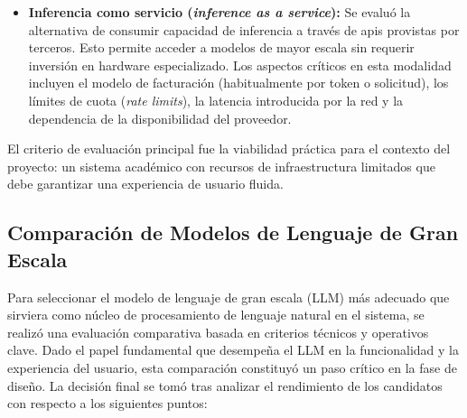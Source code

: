 \begin{itemize}
En contraposición, el trabajo de \cite{jiang2023mistral} propone el modelo \textit{\textbf{Mistral 7B}} como una alternativa compacta y eficiente, planteando una visión multidimensional:

\begin{quote}
\textit{``Our work on Mistral 7B demonstrates that language models may compress knowledge more than what was previously thought. This opens up interesting perspectives: the field has so far put the emphasis on scaling laws in 2 dimensions (directly associating model capabilities to training cost...); the problem is rather 3 dimensional (model capabilities, training cost, inference cost), and much remains to be explored to obtain the best performance with the smallest possible model.''} \cite{jiang2023mistral}
\end{quote}

Si bien 7 mil millones de parámetros requiere recursos informáticos mayores a los que el grupo tuvieron a disposición durante el desarrollo del proyecto, se entiende a partir de diversas reuniones que se tuvieron con la UEFI que la facultad cuenta con recursos informáticos para realizar \textit{self-hosting} de este modelo.

\item \textbf{Inferencia como servicio (\textit{inference as a service}):} Se evaluó la alternativa de consumir capacidad de inferencia a través de \acrshort{api}s provistas por terceros. Esto permite acceder a modelos de mayor escala sin requerir inversión en hardware especializado. Los aspectos críticos en esta modalidad incluyen el modelo de facturación (habitualmente por token o solicitud), los límites de cuota (\textit{rate limits}), la latencia introducida por la red y la dependencia de la disponibilidad del proveedor.

\end{itemize}

El criterio de evaluación principal fue la viabilidad práctica para el contexto del proyecto: un sistema académico con recursos de infraestructura limitados que debe garantizar una experiencia de usuario fluida.

\subsection{Comparación de Modelos de Lenguaje de Gran Escala}
\label{subsection:3-RNF4: Comparación de Modelos de Lenguaje de Gran Escala}

Para seleccionar el modelo de lenguaje de gran escala (LLM) más adecuado que sirviera como núcleo de procesamiento de lenguaje natural en el sistema, se realizó una evaluación comparativa basada en criterios técnicos y operativos clave. Dado el papel fundamental que desempeña el LLM en la funcionalidad y la experiencia del usuario, esta comparación constituyó un paso crítico en la fase de diseño. La decisión final se tomó tras analizar el rendimiento de los candidatos con respecto a los siguientes puntos:

